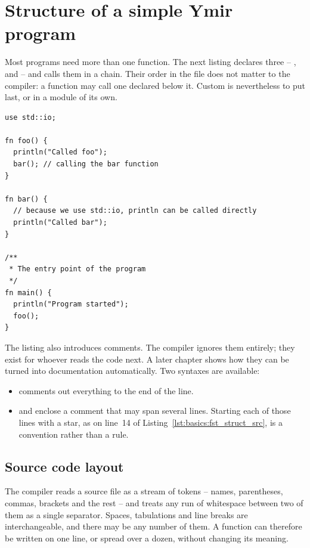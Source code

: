 \section{Structure of a simple Ymir program}
\label{sec:basics:program_structure}

Most programs need more than one function. The next listing declares three --
,  and  -- and calls them in a chain. Their
order in the file does not matter to the compiler: a function may call one
declared below it. Custom is nevertheless to put  last, or in a
module of its own.

\begin{lstlisting}[style=coloredverbatim, caption=First structured source file, label=lst:basics:fst_struct_src]
use std::io;

fn foo() {
  println("Called foo");
  bar(); // calling the bar function
}

fn bar() {
  // because we use std::io, println can be called directly
  println("Called bar");
}

/**
 * The entry point of the program
 */
fn main() {
  println("Program started");
  foo();
}
\end{lstlisting}

The listing also introduces comments. The compiler ignores them entirely; they
exist for whoever reads the code next. A later chapter shows how they can be
turned into documentation automatically. Two syntaxes are available:

\begin{itemize}
\item \token{//} comments out everything to the end of the line.
\item \token{/*} and \token{*/} enclose a comment that may span several lines.
  Starting each of those lines with a star, as on line~14 of
  Listing~\ref{lst:basics:fst_struct_src}, is a convention rather than a rule.
\end{itemize}

\subsection{Source code layout}
\label{sec:basics:source_layout}

The compiler reads a source file as a stream of tokens -- names, parentheses,
commas, brackets and the rest -- and treats any run of whitespace between two of
them as a single separator. Spaces, tabulations and line breaks are
interchangeable, and there may be any number of them. A function can therefore be
written on one line, or spread over a dozen, without changing its meaning.

